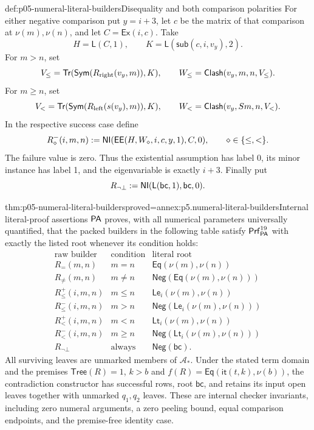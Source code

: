 \begin{hbdefinition}{def:p05-numeral-literal-builders}{Disequality and both comparison polarities}
For either negative comparison put \(y=i+3\), let \(c\) be the matrix
of that comparison at \(\nu(m),\nu(n)\), and let
\(C=\mathsf{Ex}(i,c)\). Take
\[
 H=\mathsf L(C,1),\qquad
 K=\mathsf L(\mathsf{sub}(c,i,v_y),2).
\]
For \(m>n\), set
\[
 V_{\leq}=\mathsf{Tr}(\mathsf{Sym}(R_{\rm right}(v_y,m)),K),\qquad
 W_{\leq}=\mathsf{Clash}(v_y,m,n,V_{\leq}).
\]
For \(m\geq n\), set
\[
 V_<=\mathsf{Tr}(\mathsf{Sym}(R_{\rm left}(s(v_y),m)),K),\qquad
 W_<=\mathsf{Clash}(v_y,Sm,n,V_<).
\]
In the respective success case define
\[
 R_\diamond^-(i,m,n)\mathrel{:=}
 \mathsf{NI}(\mathsf{EE}(H,W_\diamond,i,c,y,1),C,0),
                 \qquad\diamond\in\{\leq,<\}.
\]
The failure value is zero. Thus the existential assumption has label 0,
its minor instance has label 1, and the eigenvariable is exactly \(i+3\).
Finally put
\[
 R_{\neg\bot}\mathrel{:=}\mathsf{NI}(\mathsf L(\mathsf{bc},1),\mathsf{bc},0).
\]
\end{hbdefinition}

\begin{hbtheorem}{thm:p05-numeral-literal-builders}{proved=annex:p5.numeral-literal-builders}{Internal literal-proof assertions}
\(\mathsf{PA}\) proves, with all numerical parameters universally quantified,
that the packed builders in the following table satisfy
\(\mathsf{Prf}^{19}_{\mathsf{PA}}\) with exactly the listed root whenever its
condition holds:
\[
\begin{array}{c|c|c}
 \text{raw builder}&\text{condition}&\text{literal root}\\\hline
 R_=(m,n)&m=n&\mathsf{Eq}(\nu(m),\nu(n))\\
 R_{\ne}(m,n)&m\ne n&\mathsf{Neg}(\mathsf{Eq}(\nu(m),\nu(n)))\\
 R_{\leq}^+(i,m,n)&m\leq n&\mathsf{Le}_i(\nu(m),\nu(n))\\
 R_{\leq}^-(i,m,n)&m>n&\mathsf{Neg}(\mathsf{Le}_i(\nu(m),\nu(n)))\\
 R_<^+(i,m,n)&m<n&\mathsf{Lt}_i(\nu(m),\nu(n))\\
 R_<^-(i,m,n)&m\geq n&\mathsf{Neg}(\mathsf{Lt}_i(\nu(m),\nu(n)))\\
 R_{\neg\bot}&\text{always}&\mathsf{Neg}(\mathsf{bc}).
\end{array}
\]
All surviving leaves are unmarked members of \(\mathcal A_*\).
Under the stated term domain and the premises \(\mathsf{Tree}(R)=1\),
\(k>b\) and \(f(R)=\mathsf{Eq}(\mathsf{it}(t,k),\nu(b))\), the
contradiction constructor has successful rows, root \(\mathsf{bc}\), and
retains its input open leaves together with unmarked \(q_1,q_2\) leaves.
These are internal checker invariants, including
zero numeral arguments, a zero peeling bound, equal comparison endpoints,
and the premise-free identity case.
\end{hbtheorem}

